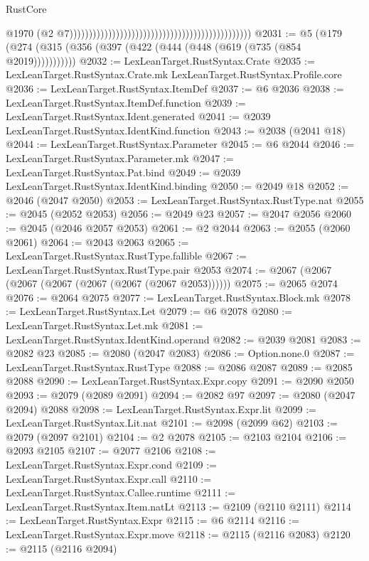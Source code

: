 \begin{lexlean}{RustCore}
\begin{coremodule}
                                                                                                @1970
                                                                                                (@2
                                                                                                  @7)))))))))))))))))))))))))))))))))))))))))))))))
@2031 := @5 (@179 (@274 (@315 (@356 (@397 (@422 (@444 (@448 (@619 (@735 (@854 @2019)))))))))))
@2032 := LexLeanTarget.RustSyntax.Crate
@2035 := LexLeanTarget.RustSyntax.Crate.mk LexLeanTarget.RustSyntax.Profile.core
@2036 := LexLeanTarget.RustSyntax.ItemDef
@2037 := @6 @2036
@2038 := LexLeanTarget.RustSyntax.ItemDef.function
@2039 := LexLeanTarget.RustSyntax.Ident.generated
@2041 := @2039 LexLeanTarget.RustSyntax.IdentKind.function
@2043 := @2038 (@2041 @18)
@2044 := LexLeanTarget.RustSyntax.Parameter
@2045 := @6 @2044
@2046 := LexLeanTarget.RustSyntax.Parameter.mk
@2047 := LexLeanTarget.RustSyntax.Pat.bind
@2049 := @2039 LexLeanTarget.RustSyntax.IdentKind.binding
@2050 := @2049 @18
@2052 := @2046 (@2047 @2050)
@2053 := LexLeanTarget.RustSyntax.RustType.nat
@2055 := @2045 (@2052 @2053)
@2056 := @2049 @23
@2057 := @2047 @2056
@2060 := @2045 (@2046 @2057 @2053)
@2061 := @2 @2044
@2063 := @2055 (@2060 @2061)
@2064 := @2043 @2063
@2065 := LexLeanTarget.RustSyntax.RustType.fallible
@2067 := LexLeanTarget.RustSyntax.RustType.pair @2053
@2074 := @2067 (@2067 (@2067 (@2067 (@2067 (@2067 (@2067 @2053))))))
@2075 := @2065 @2074
@2076 := @2064 @2075
@2077 := LexLeanTarget.RustSyntax.Block.mk
@2078 := LexLeanTarget.RustSyntax.Let
@2079 := @6 @2078
@2080 := LexLeanTarget.RustSyntax.Let.mk
@2081 := LexLeanTarget.RustSyntax.IdentKind.operand
@2082 := @2039 @2081
@2083 := @2082 @23
@2085 := @2080 (@2047 @2083)
@2086 := Option.none.{0}
@2087 := LexLeanTarget.RustSyntax.RustType
@2088 := @2086 @2087
@2089 := @2085 @2088
@2090 := LexLeanTarget.RustSyntax.Expr.copy
@2091 := @2090 @2050
@2093 := @2079 (@2089 @2091)
@2094 := @2082 @97
@2097 := @2080 (@2047 @2094) @2088
@2098 := LexLeanTarget.RustSyntax.Expr.lit
@2099 := LexLeanTarget.RustSyntax.Lit.nat
@2101 := @2098 (@2099 @62)
@2103 := @2079 (@2097 @2101)
@2104 := @2 @2078
@2105 := @2103 @2104
@2106 := @2093 @2105
@2107 := @2077 @2106
@2108 := LexLeanTarget.RustSyntax.Expr.cond
@2109 := LexLeanTarget.RustSyntax.Expr.call
@2110 := LexLeanTarget.RustSyntax.Callee.runtime
@2111 := LexLeanTarget.RustSyntax.Item.natLt
@2113 := @2109 (@2110 @2111)
@2114 := LexLeanTarget.RustSyntax.Expr
@2115 := @6 @2114
@2116 := LexLeanTarget.RustSyntax.Expr.move
@2118 := @2115 (@2116 @2083)
@2120 := @2115 (@2116 @2094)

\end{coremodule}
\end{lexlean}
